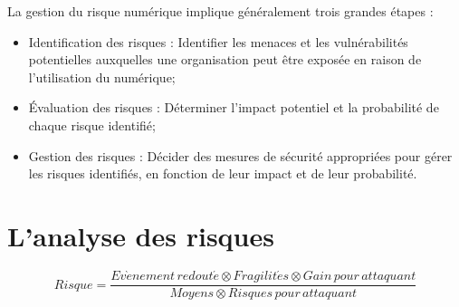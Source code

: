 La gestion du risque numérique implique généralement trois grandes étapes :


\begin{itemize}
  \item Identification des risques : Identifier les menaces et les vulnérabilités potentielles auxquelles une organisation peut être exposée en raison de l'utilisation du numérique;
  \item Évaluation des risques : Déterminer l'impact potentiel et la probabilité de chaque risque identifié;
  \item Gestion des risques : Décider des mesures de sécurité appropriées pour gérer les risques identifiés, en fonction de leur impact et de leur probabilité.
\end{itemize}


\section{L'analyse des risques}

\begin{nota}
\begin{equation}
Risque = \frac{Ev\grave{e}nement\,redout\acute{e}\otimes Fragilit\acute{e}s\otimes Gain\,pour\,attaquant}{Moyens\otimes Risques\,pour\,attaquant}
\end{equation}
\end{nota}


